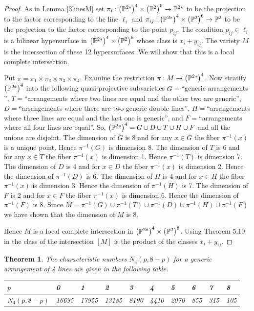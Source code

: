 \documentclass[12pt]{article}
\theoremstyle{plain}
\newtheorem{theorem}{Theorem}
\theoremstyle{definition}
\newcommand{\N}{N}
\renewcommand{\P}{\ensuremath \mathbb{P}}
\begin{document}
\begin{proof}

As in Lemma \ref{3linesM} set $\pi_i : \left( \P^{2*}\right)^4 \times \left( \P^2 \right)^6\to \P^{2*}$ to be the projection to the factor corresponding to the line $\ell_i$ and $\pi_{ij} : \left( \P^{2*}\right)^4 \times \left( \P^2 \right)^6\to \P^{2}$ to be the projection to the factor corresponding to the point $p_{ij}$. The condition $p_{ij}\in \ell_i$ is a bilinear hypersurface in $\left( \P^{2*}\right)^{4}\times \left( \P^{2}\right)^{6}$ whose class is $x_i+y_{ij}$. The variety $M$ is the intersection of these 12 hypersurfaces.  We will show that this is a local complete intersection.

Put $\pi=\pi_1\times \pi_2\times \pi_3\times \pi_4$. Examine the restriction $\pi :M \to \left(\P^{2*}\right)^4$. Now stratify $\left(\P^{2*}\right)^4$ into the following quasi-projective subvarieties $G=$``generic arrangements '', $T=$``arrangements where two lines are equal and the other two are generic'', $D=$``arrangements where there are two generic double lines'', $H=$``arrangements where three lines are equal and the last one is generic'', and $F=$``arrangements where all four lines are equal''. So, $\left(\P^{2*}\right)^4=G\cup D\cup T\cup H\cup F$ and all the unions are disjoint. The dimension of $G$ is 8 and for any $x\in G$ the fiber  $\pi^{-1}(x)$ is a unique point. Hence $\pi^{-1}(G)$ is dimension 8. The dimension of $T$ is 6 and for any $x\in T$ the fiber  $\pi^{-1}(x)$ is dimension 1. Hence $\pi^{-1}(T)$ is dimension 7. The dimension of $D$ is 4 and for $x\in D$ the fiber  $\pi^{-1}(x)$ is dimension 2. Hence the dimension of $\pi^{-1}(D)$ is 6. The dimension of $H$ is 4 and for $x\in H$ the fiber  $\pi^{-1}(x)$ is dimension 3. Hence the dimension of $\pi^{-1}(H)$ is 7. The dimension of $F$ is 2 and for $x\in F$ the fiber  $\pi^{-1}(x)$ is dimension 6. Hence the dimension of $\pi^{-1}(F)$ is 8. Since $M=\pi^{-1}(G)\cup\pi^{-1}(T)\cup\pi^{-1}(D)\cup\pi^{-1}(H)\cup\pi^{-1}(F)$ we have shown that the dimension of $M$ is 8. 

Hence $M$ is a local complete intersection in $\left( \P^{2*}\right)^4 \times \left( \P^2 \right)^6$. Using Theorem 5.10 in \cite{EH} the class of the intersection $[M]$ is the product of the classes $x_i+y_{ij}$.
\end{proof}

\begin{theorem} \label{cn}
The characteristic numbers $\N_4(p,8-p)$ for a generic arrangement
of 4 lines are given in the following table.

\begin{tabular}{|l||l|l|l|l|l|l|l|l|l|}
\hline $p$ & 0 & 1 & 2 & 3 & 4 & 5 & 6 & 7 & 8 \\ \hline 


$\N_4(p,8-p)$ 
& 16695 & 17955 & 13185 & 8190 & 4410 & 2070 & 855 & 315 & 105  
\\ \hline
\end{tabular}


\end{theorem}
\end{document}

